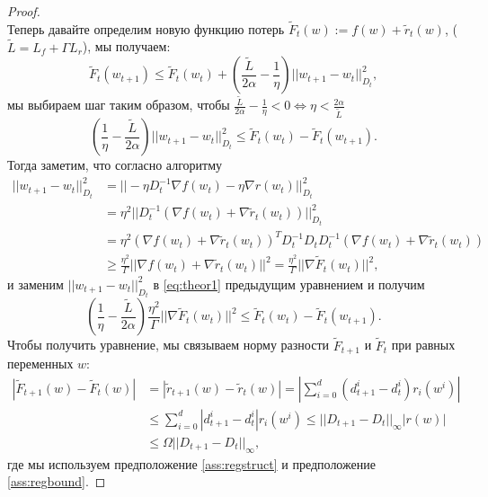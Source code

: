 \begin{proof}
\begin{equation*}
\end{equation*}
Теперь давайте определим новую функцию потерь
$\widetilde{F}_t(w) := f(w) + \tilde{r}_t(w)$, ($\tilde{L}=L_f + \Gamma L_{r}$), мы получаем:
\begin{equation*}
    \widetilde{F}_t(w_{t+1}) \leq \widetilde{F}_t(w_t) + \left( \frac{\widetilde{L}}{2\alpha} - \frac{1}{\eta}  \right) ||w_{t+1} - w_t||_{D_t}^2,
\end{equation*}
мы выбираем шаг таким образом, чтобы $ \frac{\tilde{L}}{2\alpha} - \frac{1}{\eta} < 0 \Leftrightarrow \eta < \frac{2 \alpha}{\tilde{L}}$
\begin{equation}
\label{eq:theor1}
    \left(\frac{1}{\eta} - \frac{\tilde{L}}{2\alpha}   \right) ||w_{t+1} - w_t||_{D_t}^2 \leq \tilde{F}_t(w_t) - \tilde{F}_t(w_{t+1}).
\end{equation}
Тогда заметим, что согласно алгоритму
\begin{equation*}
\begin{aligned}
    ||w_{t+1} - w_t||^2_{D_t} &= ||-\eta D_t^{-1} \nabla f(w_t) - \eta \nabla r(w_t)||_{D_t}^2 \\
    &= \eta^2 || D_t^{-1} 
    ( \nabla f(w_t) + \nabla \widetilde{r}_t(w_t) ) ||_{D_t}^2 \\
    &= \eta^2  ( \nabla f(w_t) + \nabla \widetilde{r}_t(w_t))^T D_t^{-1} D_t  D_t^{-1} 
    ( \nabla f(w_t) + \nabla \widetilde{r}_t(w_t) ) \\
    &\ge \frac{\eta^2}{\Gamma} || \nabla f(w_t) + \nabla \widetilde{r}_t(w_t) ||^2 = \frac{\eta^2}{\Gamma} ||\nabla\widetilde{F}_t(w_t)||^2,
\end{aligned}
\end{equation*}
и заменим $||w_{t+1} - w_t||^2_{D_t}$ в \eqref{eq:theor1} предыдущим уравнением и получим
\begin{equation}
\label{eq:theor1-1}
    \left(\frac{1}{\eta} - \frac{\tilde{L}}{2\alpha}   \right) \frac{\eta^2}{\Gamma} || \nabla\widetilde{F}_t(w_t) ||^2 \leq \tilde{F}_t(w_t) - \tilde{F}_t(w_{t+1}).
\end{equation}
Чтобы получить уравнение, мы связываем норму разности $\tilde{F}_{t+1}$ и $\tilde{F}_t$ при равных переменных $w$:
\begin{equation*}
\begin{aligned}
    | \widetilde{F}_{t+1}(w) - \widetilde{F}_{t}(w)| &= |\widetilde{r}_{t+1}(w) - \widetilde{r}_t(w) | = \left|\sum\limits_{i=0}^d (d_{t+1}^i - d^i_t)r_i(w^i) \right| \\
    &\leq \sum\limits_{i=0}^d |d_{t+1}^i - d^i_t| r_i(w^i) \leq ||D_{t+1} - D_t||_\infty |r(w)| \\
    &\leq \Omega ||D_{t+1} - D_t||_\infty,
\end{aligned}
\end{equation*}
где мы используем предположение \ref{ass:regstruct} и предположение \ref{ass:regbound}.


\end{proof}
